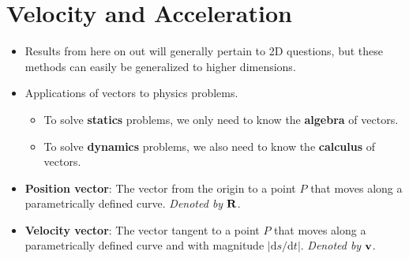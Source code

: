 \documentclass[../main.tex]{subfiles}
\begin{document}
\section{Velocity and Acceleration}
\begin{itemize}
    \item Results from here on out will generally pertain to 2D questions, but these methods can easily be generalized to higher dimensions.
    \item Applications of vectors to physics problems.
    \begin{itemize}
        \item To solve \textbf{statics} problems, we only need to know the \textbf{algebra} of vectors.
        \item To solve \textbf{dynamics} problems, we also need to know the \textbf{calculus} of vectors.
    \end{itemize}
    \item \textbf{Position vector}: The vector from the origin to a point $P$ that moves along a parametrically defined curve. \emph{Denoted by} $\vb{R}$.
    \item \textbf{Velocity vector}: The vector tangent to a point $P$ that moves along a parametrically defined curve and with magnitude $|\text{d}s/\text{d}t|$. \emph{Denoted by} $\vb{v}$.
    \begin{figure}[H]
        \centering
\end{figure}
\end{itemize}
\end{document}
